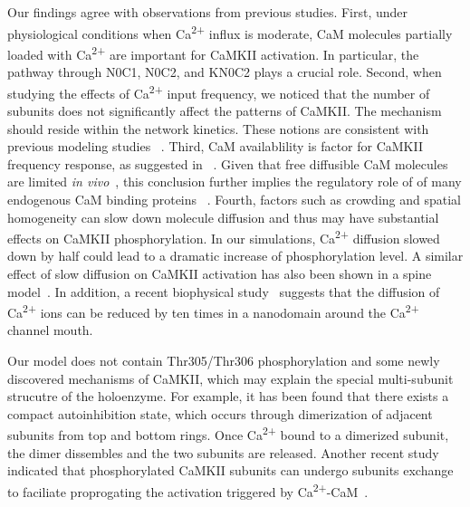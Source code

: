\documentclass[10pt,letterpaper]{article}
\begin{document}
Our findings agree with observations from previous studies. First, under physiological conditions when Ca\textsuperscript{2+} influx is moderate, CaM molecules partially loaded with Ca\textsuperscript{2+} are important for CaMKII activation. In particular, the pathway through N0C1, N0C2, and KN0C2 plays a crucial role. Second, when studying the effects of Ca\textsuperscript{2+} input frequency, we noticed that the number of subunits does not significantly affect the patterns of CaMKII. The mechanism should reside within the network kinetics. These notions are consistent with previous modeling studies ~\cite{Kubota:2001ul,Pepke:2010ju,Michalski:2012ds}. Third, CaM availablility is factor for CaMKII frequency response, as suggested in ~\cite{DeKoninck:1998wh}. Given that free diffusible CaM molecules are limited \textit{in vivo}~\cite{2008BpJ....95.6002S,Persechini:2002tb,LubyPhelps:1995kl}, this conclusion further implies the regulatory role of of many endogenous CaM binding proteins ~\cite{Skene:1990kf}. Fourth, factors such as crowding and spatial homogeneity can slow down molecule diffusion and thus may have substantial effects on CaMKII phosphorylation. In our simulations, Ca\textsuperscript{2+} diffusion slowed down by half could lead to a dramatic increase of phosphorylation level. A similar effect of slow diffusion on CaMKII activation has also been shown in a spine model~\cite{Bhalla:2004cu}. In addition, a recent biophysical study~\cite{2013PNAS..11015794T} suggests that the diffusion of Ca\textsuperscript{2+} ions can be reduced by ten times in a nanodomain around the Ca\textsuperscript{2+} channel mouth. 

Our model does not contain Thr305/Thr306 phosphorylation and some newly discovered mechanisms of CaMKII, which may explain the special multi-subunit strucutre of the holoenzyme. For example, it has been found that there exists a compact autoinhibition state, which occurs through dimerization of adjacent subunits from top and bottom rings. Once Ca\textsuperscript{2+} bound to a dimerized subunit, the dimer dissembles and the two subunits are released. Another recent study indicated that phosphorylated CaMKII subunits can undergo subunits exchange to faciliate proprogating the activation triggered by Ca\textsuperscript{2+}-CaM~\cite{Stratton:2014ct}. 

\end{document}
